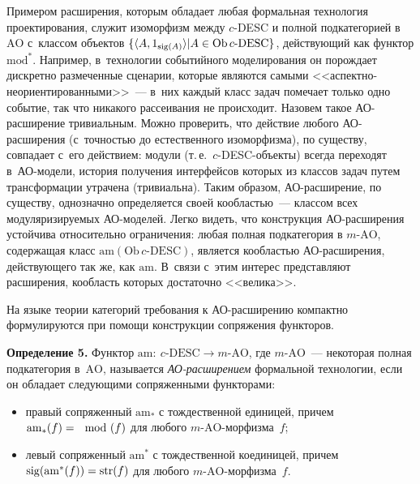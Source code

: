 \begin{multicols}{2}
 Примером расширения, которым обладает любая формальная технология
проектирования, служит изоморфизм между $c$-DESC и полной
подкатегорией в~$\mathrm{AO}$ с~классом объектов
$\{\langle A, 1_{\mathrm{sig}(A)}\rangle \vert A \hm\in
\mathrm{Ob}\, c\mbox{-}\mathrm{DESC}\}$, действующий как функтор $\mathrm{mod}^*$.
Например, в~технологии событийного моделирования он порождает дискретно
размеченные сценарии, которые являются самыми
 <<ас\-пект\-но-не\-ори\-ен\-ти\-ро\-ван\-ны\-ми>>~--- в~них каждый класс
задач помечает только одно событие, так что никакого рассеивания не
происходит. Назовем такое АО-рас\-ши\-ре\-ние тривиальным. Можно
проверить, что действие любого АО-рас\-ши\-ре\-ния (с~точ\-ностью до
естественного изоморфизма), по существу, совпадает с~его действием: модули
(т.\,е.\ $c$-DESC-объ\-ек\-ты) всегда переходят в~АО-мо\-де\-ли, история
получения интерфейсов которых из классов задач путем трансформации
утрачена (тривиальна). Таким образом, АО-рас\-ши\-ре\-ние, по существу,
однозначно определяется своей кообластью~--- классом всех
модуляризируемых АО-мо\-де\-лей. Легко видеть, что конструкция
 АО-рас\-ши\-ре\-ния устойчива относительно ограничения: любая полная
подкатегория в $m$-$\mathrm{AO}$, содержащая класс $\mathrm{am}(\mathrm{Ob}\,
 c\mbox{-}\mathrm{DESC})$, является кообластью АО-рас\-ши\-ре\-ния, действующего
так же, как $\mathrm{am}$. В~связи с~этим интерес представляют расширения, кообласть
которых достаточно <<ве\-лика>>.
{

}

 На языке теории категорий требования к АО-рас\-ши\-ре\-нию компактно
формулируются при помощи конструкции сопряжения функторов.

 \medskip

 \noindent
 \textbf{Определение 5.} Функтор $\mathrm{am}:\ c\mbox{-}\mathrm{DESC} \to m\mbox{-}\mathrm{AO}$,
где $m$-$\mathrm{AO}$~--- некоторая полная подкатегория в~$\mathrm{AO}$, называется
\textit{АО-рас\-ши\-ре\-ни\-ем} формальной технологии, если он обладает
следующими сопряженными функторами:
 \begin{itemize}
\item правый сопряженный $\mathrm{am}_*$ с тождественной единицей, причем
$\mathrm{am}_*(f)\hm = \mod(f)$ для любого $m$-$\mathrm{AO}$-морфизма~$f$;
\item левый сопряженный $\mathrm{am}^*$ с тождественной коединицей, причем
$\mathrm{sig}(\mathrm{am}^*(f)) \hm= \mathrm{str}(f)$ для любого
$m$-$\mathrm{AO}$-морфизма~$f$.
\end{itemize}


\end{multicols}
